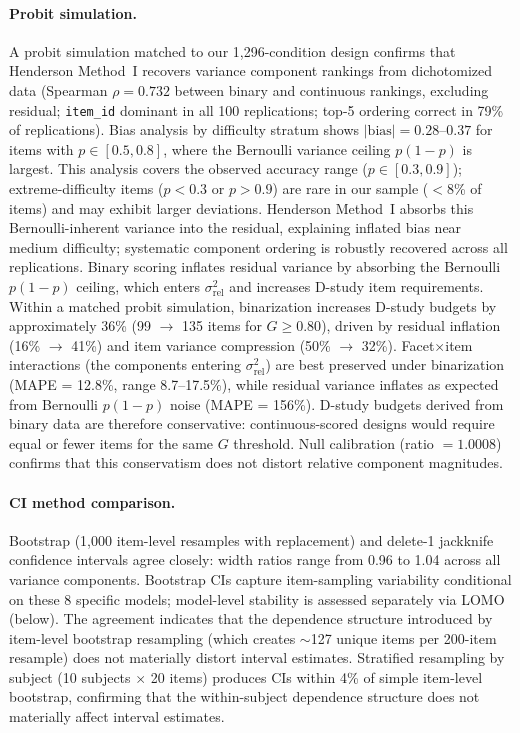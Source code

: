 \paragraph{Probit simulation.} A probit simulation matched to our 1,296-condition design confirms that Henderson Method~I recovers variance component rankings from dichotomized data (Spearman $\rho = 0.732$ between binary and continuous rankings, excluding residual; \texttt{item\_id} dominant in all 100 replications; top-5 ordering correct in 79\% of replications). Bias analysis by difficulty stratum shows $|\text{bias}| = 0.28$--$0.37$ for items with $p \in [0.5, 0.8]$, where the Bernoulli variance ceiling $p(1{-}p)$ is largest. This analysis covers the observed accuracy range ($p \in [0.3, 0.9]$); extreme-difficulty items ($p < 0.3$ or $p > 0.9$) are rare in our sample ($<$8\% of items) and may exhibit larger deviations. Henderson Method~I absorbs this Bernoulli-inherent variance into the residual, explaining inflated bias near medium difficulty; systematic component ordering is robustly recovered across all replications. Binary scoring inflates residual variance by absorbing the Bernoulli $p(1{-}p)$ ceiling, which enters $\sigma^2_\text{rel}$ and increases D-study item requirements. Within a matched probit simulation, binarization increases D-study budgets by approximately 36\% (99 $\to$ 135 items for $G \geq 0.80$), driven by residual inflation (16\% $\to$ 41\%) and item variance compression (50\% $\to$ 32\%). Facet$\times$item interactions (the components entering $\sigma^2_\text{rel}$) are best preserved under binarization (MAPE = 12.8\%, range 8.7--17.5\%), while residual variance inflates as expected from Bernoulli $p(1{-}p)$ noise (MAPE = 156\%). D-study budgets derived from binary data are therefore conservative: continuous-scored designs would require equal or fewer items for the same $G$ threshold. Null calibration (ratio $= 1.0008$) confirms that this conservatism does not distort relative component magnitudes.

\paragraph{CI method comparison.} Bootstrap (1,000 item-level resamples with replacement) and delete-1 jackknife confidence intervals agree closely: width ratios range from 0.96 to 1.04 across all variance components. Bootstrap CIs capture item-sampling variability conditional on these 8 specific models; model-level stability is assessed separately via LOMO (below). The agreement indicates that the dependence structure introduced by item-level bootstrap resampling (which creates $\sim$127 unique items per 200-item resample) does not materially distort interval estimates. Stratified resampling by subject (10 subjects $\times$ 20 items) produces CIs within 4\% of simple item-level bootstrap, confirming that the within-subject dependence structure does not materially affect interval estimates.

